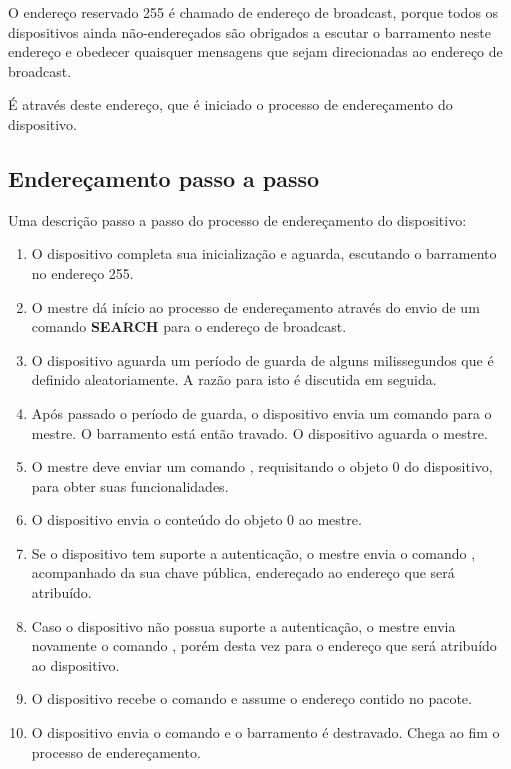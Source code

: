 O endereço reservado 255 é chamado de endereço de broadcast, porque todos os dispositivos ainda não-endereçados são obrigados a escutar o barramento neste endereço e obedecer quaisquer mensagens que sejam direcionadas ao endereço de broadcast.

É através deste endereço, que é iniciado o processo de endereçamento do dispositivo.

\subsection{Endereçamento passo a passo}

Uma descrição passo a passo do processo de endereçamento do dispositivo:

\begin{enumerate}

\item O dispositivo completa sua inicialização e aguarda, escutando o barramento no endereço 255.
\item O mestre dá início ao processo de endereçamento através do envio de um comando \textbf{SEARCH} para o endereço de broadcast.
\item O dispositivo aguarda um período de guarda de alguns milissegundos que é definido aleatoriamente. A razão para isto é discutida em seguida.
\item Após passado o período de guarda, o dispositivo envia um comando  para o mestre. O barramento está então travado. O dispositivo aguarda o mestre.
\item O mestre deve enviar um comando , requisitando o objeto 0 do dispositivo, para obter suas funcionalidades.
\item O dispositivo envia o conteúdo do objeto 0 ao mestre.
\item Se o dispositivo tem suporte a autenticação, o mestre envia o comando , acompanhado da sua chave pública, endereçado ao endereço que será atribuído.
\item Caso o dispositivo não possua suporte a autenticação, o mestre envia novamente o comando , porém desta vez para o endereço que será atribuído ao dispositivo.
\item O dispositivo recebe o comando e assume o endereço contido no pacote.
\item O dispositivo envia o comando  e o barramento é destravado. Chega ao fim o processo de endereçamento.

\end{enumerate}

